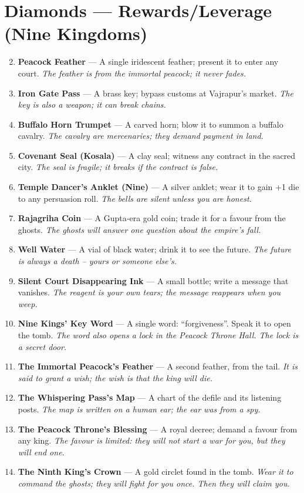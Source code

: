 \documentclass[11pt]{book}
\begin{document}
\section*{Diamonds — Rewards/Leverage (Nine Kingdoms)}
\begin{enumerate}
\setcounter{enumi}{1}
\item \textbf{Peacock Feather} — A single iridescent feather; present it to enter any court. \textit{The feather is from the immortal peacock; it never fades.}
\item \textbf{Iron Gate Pass} — A brass key; bypass customs at Vajrapur’s market. \textit{The key is also a weapon; it can break chains.}
\item \textbf{Buffalo Horn Trumpet} — A carved horn; blow it to summon a buffalo cavalry. \textit{The cavalry are mercenaries; they demand payment in land.}
\item \textbf{Covenant Seal (Kosala)} — A clay seal; witness any contract in the sacred city. \textit{The seal is fragile; it breaks if the contract is false.}
\item \textbf{Temple Dancer’s Anklet (Nine)} — A silver anklet; wear it to gain +1 die to any persuasion roll. \textit{The bells are silent unless you are honest.}
\item \textbf{Rajagriha Coin} — A Gupta‑era gold coin; trade it for a favour from the ghosts. \textit{The ghosts will answer one question about the empire’s fall.}
\item \textbf{Well Water} — A vial of black water; drink it to see the future. \textit{The future is always a death – yours or someone else’s.}
\item \textbf{Silent Court Disappearing Ink} — A small bottle; write a message that vanishes. \textit{The reagent is your own tears; the message reappears when you weep.}
\item \textbf{Nine Kings’ Key Word} — A single word: “forgiveness”. Speak it to open the tomb. \textit{The word also opens a lock in the Peacock Throne Hall. The lock is a secret door.}
\item[J] \textbf{The Immortal Peacock’s Feather} — A second feather, from the tail. \textit{It is said to grant a wish; the wish is that the king will die.}
\item[Q] \textbf{The Whispering Pass’s Map} — A chart of the defile and its listening posts. \textit{The map is written on a human ear; the ear was from a spy.}
\item[K] \textbf{The Peacock Throne’s Blessing} — A royal decree; demand a favour from any king. \textit{The favour is limited: they will not start a war for you, but they will end one.}
\item[A] \textbf{The Ninth King’s Crown} — A gold circlet found in the tomb. \textit{Wear it to command the ghosts; they will fight for you once. Then they will claim you.}
\end{enumerate}
\end{document}
